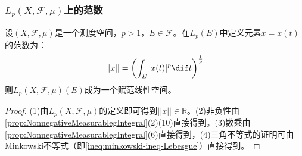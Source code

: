 \subsubsection{$L_p(X,\mathscr{F},\mu)$上的范数}
\begin{definition}
	设$(X,\mathscr{F},\mu)$是一个测度空间，$p>1$，$E\in\mathscr{F}$。在$L_p(E)$中定义元素$x=x(t)$的范数为：
	\begin{equation*}
		||x||=\left(\int_{E}^{}|x(t)|^p\dif t\right)^\frac{1}{p}
	\end{equation*}
	则$L_p(X,\mathscr{F},\mu)(E)$成为一个赋范线性空间。
\end{definition}
\begin{proof}
	(1)由$L_p(X,\mathscr{F},\mu)$的定义即可得到$||x||\in\mathbb{R}$。(2)非负性由\cref{prop:NonnegativeMeasurablegIntegral}(2)(10)直接得到。(3)数乘由\cref{prop:NonnegativeMeasurablegIntegral}(6)直接得到，(4)三角不等式的证明可由Minkowski不等式（即\cref{ineq:minkowski-ineq-Lebesgue}）直接得到。
\end{proof}

